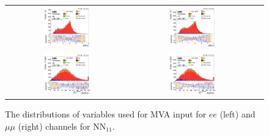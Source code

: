 \begin{figure}[ht]
  \begin{center}
    \begin{tabular}{ccc}
      \includegraphics[width=0.4\textwidth]{figures/tW/fig/MVA_input/ee/H_1j1b_dR_l1_l2.png}&
      \includegraphics[width=0.4\textwidth]{figures/tW/fig/MVA_input/mumu/H_1j1b_dR_l1_l2.png}\\
      \includegraphics[width=0.4\textwidth]{figures/tW/fig/MVA_input/ee/H_1j1b_ll_j1_pt.png}&
      \includegraphics[width=0.4\textwidth]{figures/tW/fig/MVA_input/mumu/H_1j1b_ll_j1_pt.png}\\
    \end{tabular}
    \caption{The distributions of variables used for MVA input for $ee$ (left) and $\mu\mu$ (right) channels for NN$_{11}$.
    \label{fig:MVA_1j1t_2}}
  \end{center}
\end{figure}






